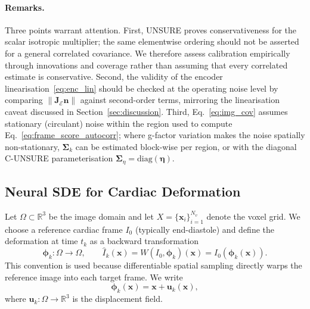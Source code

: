 \documentclass[10pt,twocolumn]{article}
\newcommand{\R}{\mathbb{R}}
\newcommand{\diag}{\mathrm{diag}}
\begin{document}
\paragraph{Remarks.}
Three points warrant attention. First, UNSURE proves conservativeness for the scalar isotropic multiplier; the same elementwise ordering should not be asserted for a general correlated covariance. We therefore assess calibration empirically through innovations and coverage rather than assuming that every correlated estimate is conservative. Second, the validity of the encoder linearisation~\eqref{eq:enc_lin} should be checked at the operating noise level by comparing $\|\bm{J}_{\mathcal{E}}\bm{n}\|$ against second-order terms, mirroring the linearisation caveat discussed in Section~\ref{sec:discussion}. Third, Eq.~\eqref{eq:img_cov} assumes stationary (circulant) noise within the region used to compute Eq.~\eqref{eq:frame_score_autocorr}; where g-factor variation makes the noise spatially non-stationary, $\bm{\Sigma}_k$ can be estimated block-wise per region, or with the diagonal C-UNSURE parameterisation $\bm{\Sigma}_\eta = \diag(\bm{\eta})$.

\subsection{Neural SDE for Cardiac Deformation}
\label{sec:neural_sde_deformation}

Let $\Omega \subset \R^3$ be the image domain and let $X=\{\bm{x}_i\}_{i=1}^{N_v}$ denote the voxel grid. We choose a reference cardiac frame $I_0$ (typically end-diastole) and define the deformation at time $t_k$ as a backward transformation
\begin{equation}
    \bm{\phi}_k : \Omega \rightarrow \Omega,
    \qquad
    \widehat I_k(\bm{x}) = W(I_0,\bm{\phi}_k)(\bm{x}) = I_0(\bm{\phi}_k(\bm{x})).
    \label{eq:warp_convention}
\end{equation}
This convention is used because differentiable spatial sampling directly warps the reference image into each target frame. We write
\begin{equation}
    \bm{\phi}_k(\bm{x}) = \bm{x} + \bm{u}_k(\bm{x}),
    \label{eq:disp_def}
\end{equation}
where $\bm{u}_k:\Omega\rightarrow\R^3$ is the displacement field.
\end{document}
